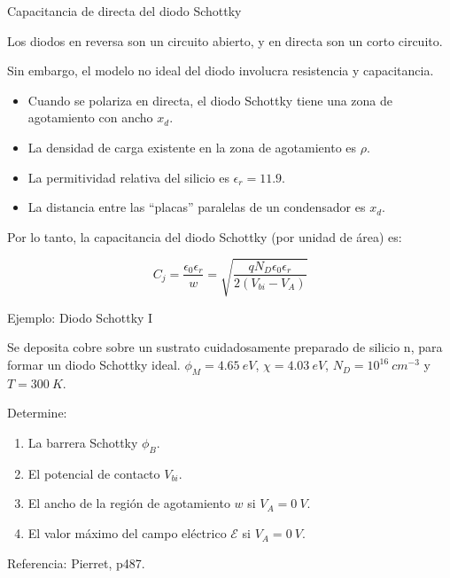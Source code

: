\documentclass[10pt,t,aspectratio=169]{beamer}
\begin{document}
\begin{frame}{Capacitancia de directa del diodo Schottky}

Los diodos en reversa son un circuito abierto, y en directa son un corto circuito.

\vspace{5mm}
Sin embargo, el modelo no ideal del diodo involucra resistencia y capacitancia.

\vspace{5mm}
\begin{itemize}
    \item Cuando se polariza en directa, el diodo Schottky tiene una zona de agotamiento con ancho $x_d$.
    \item La densidad de carga existente en la zona de agotamiento es $\rho$.
    \item La permitividad relativa del silicio es $\epsilon_r = 11.9$.
    \item La distancia entre las ``placas'' paralelas de un condensador es $x_d$.
\end{itemize}

\vspace{5mm}
Por lo tanto, la capacitancia del diodo Schottky (por unidad de área) es:

\[ \boxed{C_j = \dfrac{\epsilon_0 \epsilon_r}{w} = \sqrt{\dfrac{q N_D \epsilon_0 \epsilon_r}{2 (V_{bi} - V_A)}}} \]

\end{frame}


\begin{frame}{Ejemplo: Diodo Schottky I}

Se deposita cobre sobre un sustrato cuidadosamente preparado de silicio n, para formar un diodo Schottky ideal. $\phi_M=4.65\ eV$, $\chi=4.03\ eV$, $N_D=10^{16}\ cm^{-3}$ y $T=300\ K$. 

\vspace{5mm}Determine:

\begin{enumerate}
    \item La barrera Schottky $\phi_B$.
    \item El potencial de contacto $V_{bi}$.
    \item El ancho de la región de agotamiento $w$ si $V_A = 0\ V$.
    \item El valor máximo del campo eléctrico $\mathcal{E}$ si $V_A = 0\ V$.
\end{enumerate}

\vspace{5mm}
Referencia: Pierret, p487.
    
\end{frame}
\end{document}
